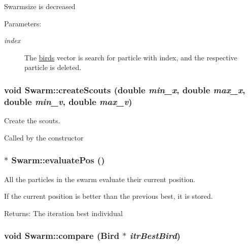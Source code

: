 Swarmsize is decreased \begin{Desc}
\item[Parameters:]
\begin{description}
\item[{\em index}]The \hyperlink{classSwarm_74191c7a473df093f5537f8d6d5ca1a6}{birds} vector is search for particle with index, and the respective particle is deleted. \end{description}
\end{Desc}
\hypertarget{classSwarm_6f91dff59bba147f5983b8fb77a4db7c}{
\subsubsection{\setlength{\rightskip}{0pt plus 5cm}void Swarm::createScouts (double {\em min\_\-x}, \/  double {\em max\_\-x}, \/  double {\em min\_\-v}, \/  double {\em max\_\-v})}}
\label{classSwarm_6f91dff59bba147f5983b8fb77a4db7c}


Create the scouts. 

Called by the constructor \hypertarget{classSwarm_a7bea159365345bccd57ac10f06e812b}{
\subsubsection{ $\ast$ Swarm::evaluatePos ()}}
\label{classSwarm_a7bea159365345bccd57ac10f06e812b}


All the particles in the swarm evaluate their current position. 

If the current position is better than the previous best, it is stored. \begin{Desc}
\item[Returns:]The iteration best individual \end{Desc}
\hypertarget{classSwarm_e0647f4af56497d936dafc35aa7989bf}{
\subsubsection{\setlength{\rightskip}{0pt plus 5cm}void Swarm::compare ({\bf Bird} $\ast$ {\em itrBestBird})}}
\label{classSwarm_e0647f4af56497d936dafc35aa7989bf}


